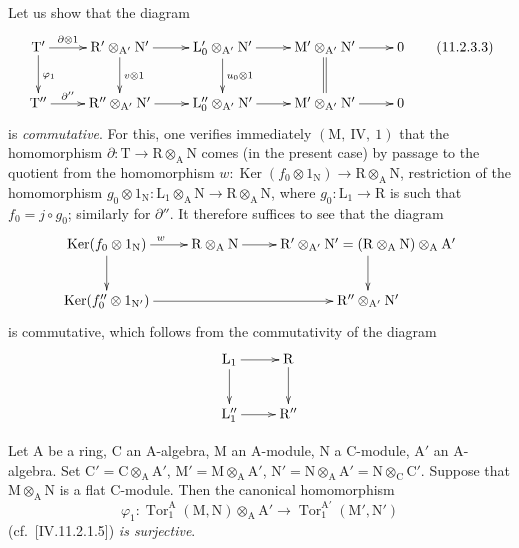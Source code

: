
Let us show that the diagram
\begin{equation}
\xymatrix{
  \mathrm{T}' \ar[r]^-{\partial\otimes 1} \ar[d]^{\varphi_1} & \mathrm{R}'\otimes_{\mathrm{A}'}\mathrm{N}' \ar[r] \ar[d]^{v\otimes 1} & \mathrm{L}'_0\otimes_{\mathrm{A}'}\mathrm{N}' \ar[r] \ar[d]^{u_0\otimes 1} & \mathrm{M}'\otimes_{\mathrm{A}'}\mathrm{N}' \ar[r] \ar@{=}[d] & 0 \\
  \mathrm{T}'' \ar[r]^-{\partial''} & \mathrm{R}''\otimes_{\mathrm{A}'}\mathrm{N}' \ar[r] & \mathrm{L}''_0\otimes_{\mathrm{A}'}\mathrm{N}' \ar[r] & \mathrm{M}'\otimes_{\mathrm{A}'}\mathrm{N}' \ar[r] & 0
}
  \tag{11.2.3.3}
\end{equation}
is \emph{commutative}. For this, one verifies immediately $(\mathrm{M},~\mathrm{IV},~1)$ that the homomorphism $\partial:\mathrm{T}\to\mathrm{R}\otimes_\mathrm{A}\mathrm{N}$ comes (in the present case) by passage to the quotient from the homomorphism $w:\operatorname{Ker}(f_0\otimes 1_\mathrm{N})\to\mathrm{R}\otimes_\mathrm{A}\mathrm{N}$, restriction of the homomorphism $g_0\otimes 1_\mathrm{N}:\mathrm{L}_1\otimes_\mathrm{A}\mathrm{N}\to\mathrm{R}\otimes_\mathrm{A}\mathrm{N}$, where $g_0:\mathrm{L}_1\to\mathrm{R}$ is such that $f_0=j\circ g_0$; similarly for $\partial''$. It therefore suffices to see that the diagram
\[
\xymatrix{
  \operatorname{Ker}(f_0\otimes 1_\mathrm{N}) \ar[r]^{w} \ar[d] & \mathrm{R}\otimes_\mathrm{A}\mathrm{N} \ar[r] & \mathrm{R}'\otimes_{\mathrm{A}'}\mathrm{N}'=(\mathrm{R}\otimes_\mathrm{A}\mathrm{N})\otimes_\mathrm{A}\mathrm{A}' \ar[d] \\
  \operatorname{Ker}(f''_0\otimes 1_{\mathrm{N}'}) \ar[rr] & & \mathrm{R}''\otimes_{\mathrm{A}'}\mathrm{N}'
}
\]
is commutative, which follows from the commutativity of the diagram
\[
\xymatrix{
  \mathrm{L}_1 \ar[r] \ar[d] & \mathrm{R} \ar[d] \\
  \mathrm{L}''_1 \ar[r] & \mathrm{R}''
}
\]

\begin{lemma}[11.2.4]
\label{IV.11.2.4}
Let $\mathrm{A}$ be a ring, $\mathrm{C}$ an $\mathrm{A}$-algebra, $\mathrm{M}$ an $\mathrm{A}$-module, $\mathrm{N}$ a $\mathrm{C}$-module, $\mathrm{A}'$ an $\mathrm{A}$-algebra. Set $\mathrm{C}'=\mathrm{C}\otimes_\mathrm{A}\mathrm{A}'$, $\mathrm{M}'=\mathrm{M}\otimes_\mathrm{A}\mathrm{A}'$, $\mathrm{N}'=\mathrm{N}\otimes_\mathrm{A}\mathrm{A}'=\mathrm{N}\otimes_\mathrm{C}\mathrm{C}'$. Suppose that $\mathrm{M}\otimes_\mathrm{A}\mathrm{N}$ is a flat $\mathrm{C}$-module. Then the canonical homomorphism
\[
  \varphi_1:\operatorname{Tor}_1^\mathrm{A}(\mathrm{M},\mathrm{N})\otimes_\mathrm{A}\mathrm{A}'\to\operatorname{Tor}_1^{\mathrm{A}'}(\mathrm{M}',\mathrm{N}')
\]
(cf.\ [IV.11.2.1.5]) \emph{is surjective}.
\end{lemma}

